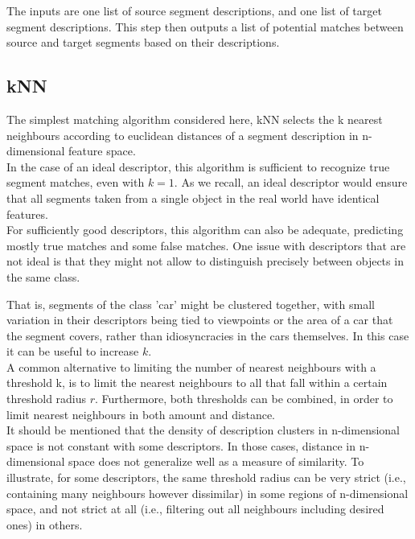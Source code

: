 The inputs are one list of source segment descriptions, and one list of target segment descriptions. This step then outputs a list of potential matches between source and target segments based on their descriptions.\\

\subsection{kNN}
\label{subsec:kNN}

The simplest matching algorithm considered here, kNN selects the k nearest neighbours according to euclidean distances of a segment description in n-dimensional feature space.\\

In the case of an ideal descriptor, this algorithm is sufficient to recognize true segment matches, even with $k = 1$. As we recall, an ideal descriptor would ensure that all segments taken from a single object in the real world have identical features.\\ 

For sufficiently good descriptors, this algorithm can also be adequate, predicting mostly true matches and some false matches. One issue with descriptors that are not ideal is that they might not allow to distinguish precisely between objects in the same class.

That is, segments of the class 'car' might be clustered together, with small variation in their descriptors being tied to viewpoints or the area of a car that the segment covers, rather than idiosyncracies in the cars themselves. In this case it can be useful to increase $k$.\\

A common alternative to limiting the number of nearest neighbours with a threshold k, is to limit the nearest neighbours to all that fall within a certain threshold radius $r$. Furthermore, both thresholds can be combined, in order to limit nearest neighbours in both amount and distance.\\

It should be mentioned that the density of description clusters in n-dimensional space is not constant with some descriptors. In those cases, distance in n-dimensional space does not generalize well as a measure of similarity. To illustrate, for some descriptors, the same threshold radius can be very strict (i.e., containing many neighbours however dissimilar) in some regions of n-dimensional space, and not strict at all (i.e., filtering out all neighbours including desired ones) in others.\\

